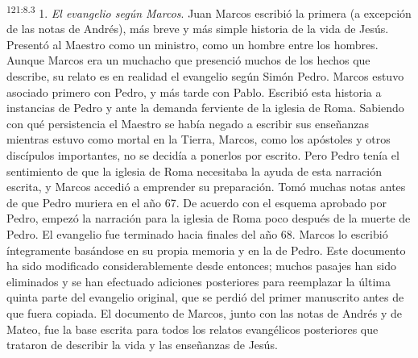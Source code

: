\par
\textsuperscript{121:8.3} 1. \textit{El evangelio según Marcos}. Juan Marcos escribió la primera (a excepción de las notas de Andrés), más breve y más simple historia de la vida de Jesús. Presentó al Maestro como un ministro, como un hombre entre los hombres. Aunque Marcos era un muchacho que presenció muchos de los hechos que describe, su relato es en realidad el evangelio según Simón Pedro. Marcos estuvo asociado primero con Pedro, y más tarde con Pablo. Escribió esta historia a instancias de Pedro y ante la demanda ferviente de la iglesia de Roma. Sabiendo con qué persistencia el Maestro se había negado a escribir sus enseñanzas mientras estuvo como mortal en la Tierra, Marcos, como los apóstoles y otros discípulos importantes, no se decidía a ponerlos por escrito. Pero Pedro tenía el sentimiento de que la iglesia de Roma necesitaba la ayuda de esta narración escrita, y Marcos accedió a emprender su preparación. Tomó muchas notas antes de que Pedro muriera en el año 67. De acuerdo con el esquema aprobado por Pedro, empezó la narración para la iglesia de Roma poco después de la muerte de Pedro. El evangelio fue terminado hacia finales del año 68. Marcos lo escribió íntegramente basándose en su propia memoria y en la de Pedro. Este documento ha sido modificado considerablemente desde entonces; muchos pasajes han sido eliminados y se han efectuado adiciones posteriores para reemplazar la última quinta parte del evangelio original, que se perdió del primer manuscrito antes de que fuera copiada. El documento de Marcos, junto con las notas de Andrés y de Mateo, fue la base escrita para todos los relatos evangélicos posteriores que trataron de describir la vida y las enseñanzas de Jesús.

